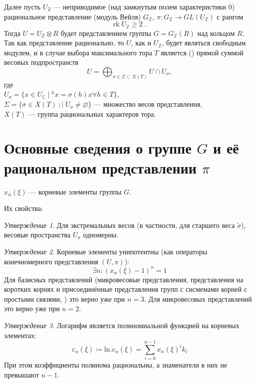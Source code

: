 \documentclass[10pt]{article}
\theoremstyle{break}
\theoremstyle{remark}
\newtheorem{prop}{Утверждение}
\newcommand{\Z}{\mathbb{Z}}
\renewcommand{\C}{\mathbb{C}}
\renewcommand{\ge}{\geqslant}
\begin{document}
Далее пусть $U_\Z$ --- неприводимое (над замкнутым полем характеристики $0$) рациональное представление (модуль Вейля) $G_\Z$, $\pi:G_\Z \to GL(U_\Z)$ с рангом
\begin{equation}\label{representationrank}\mathrm{rk} \; U_\Z \ge 2 \;. \end{equation}
Тогда $U=U_\Z\otimes R$ будет представлением группы $G=G_\Z(R)$ над кольцом $R$. Так как представление рационально, то $U$, как и $U_\Z$, будет являться свободным модулем, и в случае выбора максимального тора $T$ является (\citep{Borel1970}) прямой суммой весовых подпространств
$$U=\bigoplus_{\sigma \in \Sigma \subset X(T)} {U \cap U_\sigma} ,$$
где\\
$U_\sigma = \{x \in U_\C \; | \; ^h x = \sigma(h) x \forall h \in T \}$,\\
$\Sigma = \{\sigma \in X(T) \
; | \; U_\sigma \ne \varnothing\}$ --- множество весов представления,\\
$X(T)$ --- группа рациональных характеров тора.

\section{Основные сведения о группе $G$ и её рациональном представлении $\pi$}

$x_\alpha(\xi)$ --- корневые элементы группы $G$.

Их свойства:

\begin{prop}
Для экстремальных весов (в частности, для старшего веса $\widetilde\sigma$), весовые пространства $U_\sigma$ одномерны.
\end{prop}

\begin{prop}
Корневые элементы унипотентны (как операторы конечномерного представления $(U,\pi)$):
$$\exists n : (x_\alpha(\xi)-1)^n = 1$$
Для базисных представлений (микровесовые представления, представления на коротких корнях и присоединённые представления групп с сисмемами корней с простыми связями, \cite{Plotkin1998}) это верно уже при $n=3$. Для микровесовых представлений это верно уже при $n=2$.
\end{prop}

\begin{prop}
Логарифм является полиномиальной функцией на корневых элементах:
$$ \varepsilon_\alpha(\xi) \coloneqq \mathrm{ln} \, x_\alpha(\xi) = \sum_{i=0}^{n-1} {x_\alpha(\xi)^i k_i} $$
При этом коэффициенты полинома рациональны, а знаменатели в них не превышают $n-1$.
\end{prop}
\end{document}

